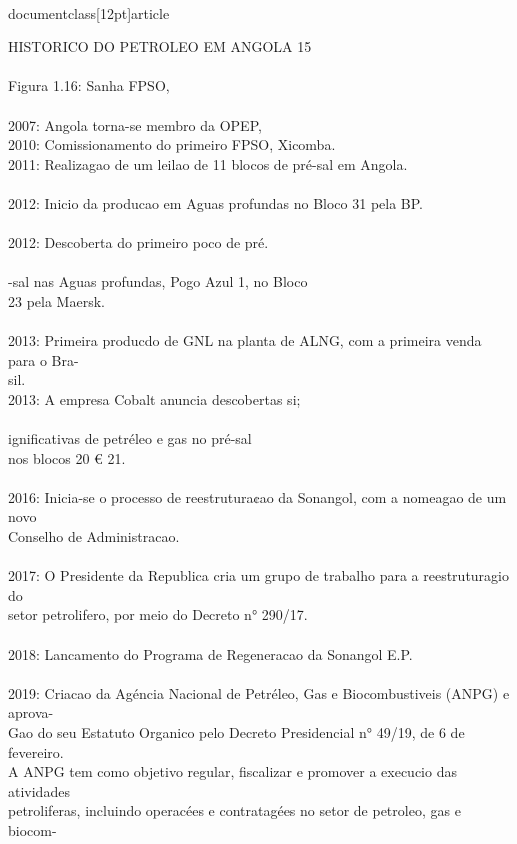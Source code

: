 \\documentclass[12pt]{article}
\begin{document}
{HISTORICO DO PETROLEO EM ANGOLA 15\\
\\
Figura 1.16: Sanha FPSO,\\
\\
2007: Angola torna-se membro da OPEP,\\
2010: Comissionamento do primeiro FPSO, Xicomba.\\
2011: Realizagao de um leilao de 11 blocos de pré-sal em Angola.\\
\\
2012: Inicio da producao em Aguas profundas no Bloco 31 pela BP.\\
\\
2012: Descoberta do primeiro poco de pré.\\
\\
-sal nas Aguas profundas, Pogo Azul 1, no Bloco\\
23 pela Maersk.\\
\\
2013: Primeira producdo de GNL na planta de ALNG, com a primeira venda para o Bra-\\
sil.\\
2013: A empresa Cobalt anuncia descobertas si;\\
\\
ignificativas de petréleo e gas no pré-sal\\
nos blocos 20 € 21.\\
\\
2016: Inicia-se o processo de reestrutura¢ao da Sonangol, com a nomeagao de um novo\\
Conselho de Administracao.\\
\\
2017: O Presidente da Republica cria um grupo de trabalho para a reestruturagio do\\
setor petrolifero, por meio do Decreto n° 290/17.\\
\\
2018: Lancamento do Programa de Regeneracao da Sonangol E.P.\\
\\
2019: Criacao da Agéncia Nacional de Petréleo, Gas e Biocombustiveis (ANPG) e aprova-\\
Gao do seu Estatuto Organico pelo Decreto Presidencial n° 49/19, de 6 de fevereiro.\\
A ANPG tem como objetivo regular, fiscalizar e promover a execucio das atividades\\
petroliferas, incluindo operacées e contratagées no setor de petroleo, gas e biocom-\\
}
\end{document}
